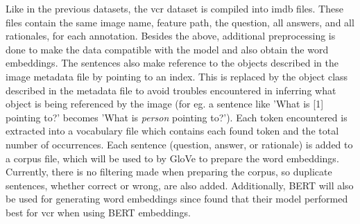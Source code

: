 Like in the previous datasets, the \gls{vcr} dataset is compiled into \gls{imdb} files.
These files contain the same image name, feature path, the question, all answers, and all rationales, for each annotation.
Besides the above, additional preprocessing is done to make the data compatible with the model and also obtain the word embeddings.
The sentences also make reference to the objects described in the image metadata file by pointing to an index.
This is replaced by the object class described in the metadata file to avoid troubles encountered in inferring what object is being referenced by the image (for eg. a sentence like 'What is [1] pointing to?' becomes 'What is \textit{person} pointing to?').
Each token encountered is extracted into a vocabulary file which contains each found token and the total number of occurrences.
Each sentence (question, answer, or rationale) is added to a \gls{corpus} file, which will be used to by GloVe to prepare the word embeddings.
Currently, there is no filtering made when preparing the corpus, so duplicate sentences, whether correct or wrong, are also added.
Additionally, BERT will also be used for generating word embeddings since \citeauthor{zellers_recognition_2019} found that their model performed best for \gls{vcr} when using BERT embeddings\cite{zellers_recognition_2019}.
